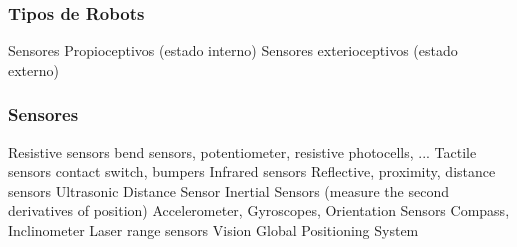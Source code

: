 \begin{frame}
    \frametitle{Tipos de Robots}
    
    Sensores Propioceptivos (estado interno)
    Sensores exterioceptivos (estado externo)
    
\end{frame}


\begin{frame}
    \frametitle{Sensores}
    Resistive sensors
    bend sensors, potentiometer, resistive
    photocells, ...
    Tactile sensors
    contact switch, bumpers
    Infrared sensors
    Reflective, proximity, distance sensors
    Ultrasonic Distance Sensor
    Inertial Sensors (measure the second derivatives
    of position)
    Accelerometer, Gyroscopes,
    Orientation Sensors
    Compass, Inclinometer
    Laser range sensors
    Vision
    Global Positioning System
\end{frame}


